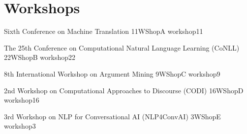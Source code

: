 \chapter[Workshops: \daydate]{Workshops}
\thispagestyle{emptyheader}
\vfill




\clearpage
{}

      \begin{wsschedule}
      {Sixth Conference on Machine Translation}
      {11}{WShopA}
      {workshop11}
      {\WShopLocA}
      
      \end{wsschedule}

      \begin{wsschedule}
      {The 25th Conference on Computational Natural Language Learning (CoNLL)}
      {22}{WShopB}
      {workshop22}
      {\WShopLocB}
      
      \end{wsschedule}


      \begin{wsschedule}
      {8th International Workshop on Argument Mining}
      {9}{WShopC}
      {workshop9}
      {\WShopLocB}
      
      \end{wsschedule}

      \begin{wsschedule}
      {2nd Workshop on Computational Approaches to Discourse (CODI)}
      {16}{WShopD}
      {workshop16}
      {\WShopLocB}
      
      \end{wsschedule}





\begin{wsschedule}
  {3rd Workshop on NLP for Conversational AI (NLP4ConvAI)}
  {3}{WShopE}
  {workshop3}
  {\WShopLocB}
  
\end{wsschedule}

